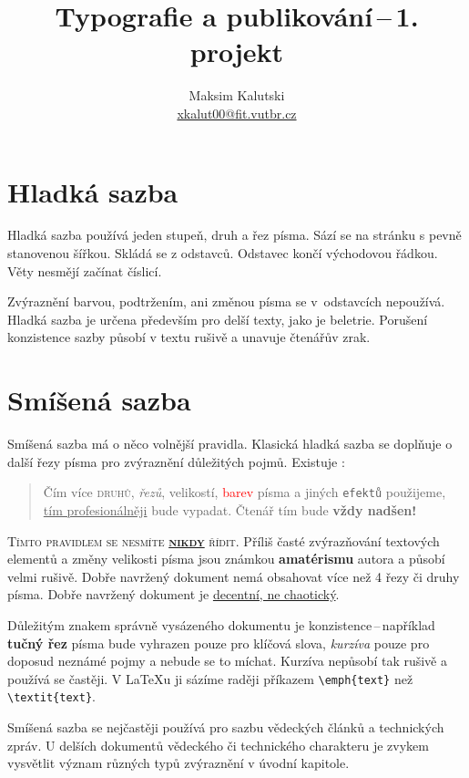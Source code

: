 \documentclass[10pt,a4paper,twocolumn, hidelinks]{article}
\title{Typografie a publikování\,--\,1. projekt}
\author{Maksim Kalutski \\ \href{mailto:xkalut00@fit.vutbr.cz}{xkalut00@fit.vutbr.cz}}
\date{}
\begin{document}
\maketitle

\section{Hladká sazba}
Hladká sazba používá jeden stupeň, druh a řez písma.
Sází se na stránku s pevně stanovenou šířkou.
Skládá se z odstavců. Odstavec končí východovou řádkou.
Věty nesmějí začínat číslicí.

Zvýraznění barvou, podtržením, ani změnou písma se v~odstavcích nepoužívá.
Hladká sazba je určena především pro delší texty, jako je beletrie.
Porušení konzistence sazby působí v textu rušivě a unavuje čtenářův zrak.

\section{Smíšená sazba}\label{sec:smisena-sazba}
Smíšená sazba má o něco volnější pravidla.
Klasická hladká sazba se doplňuje o další řezy písma pro zvýraznění důležitých pojmů.
Existuje :

\begin{quotation}
    Čím více \textsc{druhů}, \emph{řezů}, {\scriptsize velikostí}, \textcolor{red}{barev} písma a jiných \verb|efektů| použijeme, \underline{tím profesionálněji} bude {\selectfont{dokument}} vypadat.
    Čtenář tím bude \textbf{\LARGE{vždy nadšen!}}
\end{quotation}

\textsc{Tímto pravidlem se nesmíte \underline{\textbf{nikdy}} řídit.}
Příliš časté zvýrazňování textových elementů a změny {\tiny velikosti} písma jsou známkou \textbf{amatérismu} autora a působí {\ttfamily velmi rušivě}. Dobře navržený dokument nemá obsahovat více než 4 řezy či druhy písma.
Dobře navržený dokument je \underline{decentní, ne chaotický}.

Důležitým znakem správně vysázeného dokumentu je konzistence\,--\,například \textbf{tučný řez} písma bude vyhrazen pouze pro klíčová slova, \emph{kurzíva} pouze pro doposud neznámé pojmy a nebude se to míchat.
Kurzíva nepůsobí tak rušivě a používá se častěji. V \LaTeX u ji sázíme raději příkazem \verb|\emph{text}| než \verb|\textit{text}|.

Smíšená sazba se nejčastěji používá pro sazbu vědeckých článků a technických zpráv.
U delších dokumentů vědeckého či technického charakteru je zvykem vysvětlit význam různých typů zvýraznění v úvodní kapitole.
\end{document}
